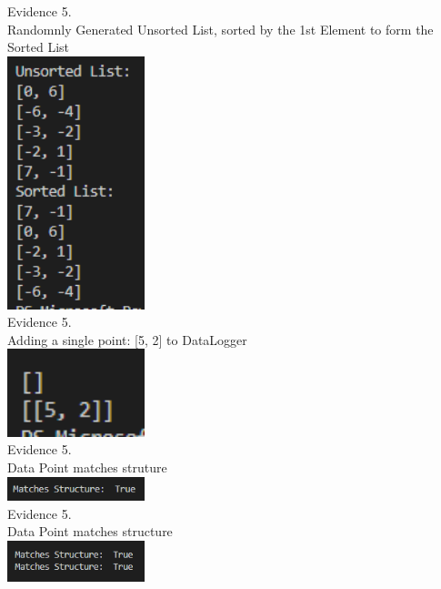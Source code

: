 \begin{flushleft}
\begin{center}
    \end{center}

    \setcounter{magicrownumbers}{0}
    \begin{center}
        {\large Evidence 5.\rn } \\ 
        \vspace{0.3cm}
        Randomnly Generated Unsorted List, sorted by the 1st Element to form the Sorted List \\
        \includegraphics[width=4cm]{Images/Testing/T4.1.1.PNG} \\

        {\large Evidence 5.\rn } \\ 
        \vspace{0.3cm}
        Adding a single point: [5, 2] to DataLogger \\
        \includegraphics[width=4cm]{Images/Testing/T4.2.1.PNG} \\

        {\large Evidence 5.\rn } \\ 
        \vspace{0.3cm}
        Data Point matches struture \\
        \includegraphics[width=4cm]{Images/Testing/T4.3.1.PNG} \\

        {\large Evidence 5.\rn } \\ 
        \vspace{0.3cm}
        Data Point matches structure \\
        \includegraphics[width=4cm]{Images/Testing/T4.4.1.PNG} \\


\end{center}
\end{flushleft}
